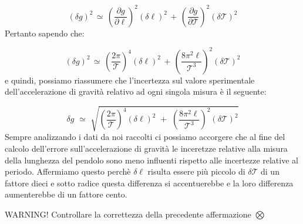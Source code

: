 \begin{equation*}
(\delta g)^2 \, \simeq \, \left( \frac{\partial g}{\partial \ell} \right)^2 (\delta \ell)^2 \, + \, \left( \frac{\partial g}{\partial \mathcal{T}} \right)^2 (\delta \mathcal{T})^2
\end{equation*}
%
Pertanto sapendo che:

\begin{equation*}
(\delta g)^2 \, \simeq \, \left( \frac{2 \pi}{\mathcal{T}} \right)^4 (\delta \ell)^2 \, + \, \left( \frac{8 \pi^2 \ell}{\mathcal{T}^3} \right)^2 (\delta \mathcal{T})^2
\end{equation*}
%
e quindi, possiamo riassumere che l'incertezza sul valore sperimentale dell'accelerazione di gravità relativo ad ogni singola misura è il seguente:

\begin{equation} \label{eq:delta_g}
\delta g \,\, \simeq \,\, \sqrt{\left( \frac{2 \pi}{\mathcal{T}} \right)^4 (\delta \ell)^2 \,\, + \,\, \left( \frac{8 \pi^2 \ell}{\mathcal{T}^3} \right)^2 (\delta \mathcal{T})^2}
\end{equation}
%
Sempre analizzando i dati da noi raccolti ci possiamo accorgere che al fine del calcolo dell'errore sull'accelerazione di gravità le inceretzze relative alla misura della lunghezza del pendolo sono meno influenti rispetto alle incertezze relative al periodo. Affermiamo questo perchè $\delta \ell$ risulta essere più piccolo di $\delta \mathcal{T}$ di un fattore dieci e sotto radice questa differenza si accentuerebbe e la loro differenza aumenterebbe di un fattore cento.

WARNING! Controllare la correttezza della precedente affermazione $\bigotimes$


